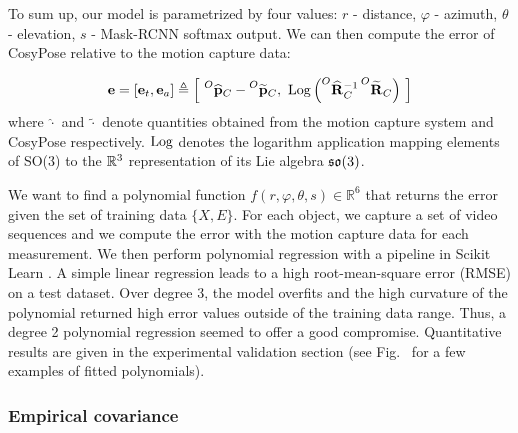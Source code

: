 
To sum up, our model is parametrized by four values: $r$ - distance, $\varphi$ - azimuth, $\theta$ - elevation, $s$ - Mask-RCNN softmax output. 
We can then compute the error of CosyPose relative to the motion capture data: 

\begin{equation}
    \mathbf{e}  = [\mathbf{e}_{t}, \mathbf{e}_{a}]  \triangleq  \left[~\prescript{O}{}{\widehat{{\bf p}}}_{C} - \prescript{O}{}{\widetilde{{\bf p}}}_{C}, ~ \operatorname*{Log} \left(\prescript{O}{}{\widehat{{\bf R}}}_{C}^{-1}\prescript{O}{}{\widetilde{{\bf R}}}_{C}\right)~\right]
\end{equation}
%
where $\widehat{\cdot}$ and $\widetilde{\cdot}$ denote quantities obtained from the motion capture system and CosyPose respectively. 
$\operatorname*{Log}$ denotes the logarithm application mapping elements of SO(3) to the $\mathbb{R}^3$ representation of its Lie algebra 
${\mathfrak {so}}(3)$.

We want to find a polynomial function $f(r, \varphi, \theta, s) \in \mathbb{R}^6$ that returns the error given the set of training data $\{X,E\}$. 
For each object, we capture a set of video sequences and we compute the error with the motion capture data for each measurement. 
We then perform polynomial regression with a pipeline in Scikit Learn \cite{scikit-learn}. A simple linear regression leads to a high root-mean-square error (RMSE) 
on a test dataset. Over degree 3, the model overfits and the high curvature of the polynomial returned high error values outside of the training data range. 
Thus, a degree 2 polynomial regression seemed to offer a good compromise.  Quantitative results are given in the experimental validation section 
(see Fig.~ for a few examples of fitted polynomials).







\subsubsection{Empirical covariance}

